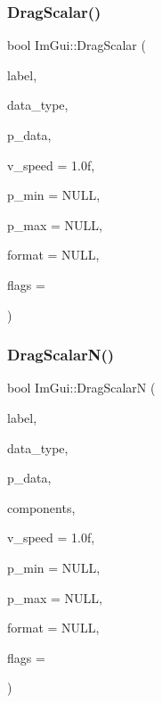 \subsubsection{\texorpdfstring{Drag\+Scalar()}{DragScalar()}}
{\footnotesize\ttfamily bool Im\+Gui\+::\+Drag\+Scalar (\begin{DoxyParamCaption}\item[{const char $\ast$}]{label,  }\item[{Im\+Gui\+Data\+Type}]{data\+\_\+type,  }\item[{\hyperlink{imgui__impl__opengl3__loader_8h_ac668e7cffd9e2e9cfee428b9b2f34fa7}{void} $\ast$}]{p\+\_\+data,  }\item[{float}]{v\+\_\+speed = {\ttfamily 1.0f},  }\item[{const \hyperlink{imgui__impl__opengl3__loader_8h_ac668e7cffd9e2e9cfee428b9b2f34fa7}{void} $\ast$}]{p\+\_\+min = {\ttfamily NULL},  }\item[{const \hyperlink{imgui__impl__opengl3__loader_8h_ac668e7cffd9e2e9cfee428b9b2f34fa7}{void} $\ast$}]{p\+\_\+max = {\ttfamily NULL},  }\item[{const char $\ast$}]{format = {\ttfamily NULL},  }\item[{Im\+Gui\+Slider\+Flags}]{flags = {} }\end{DoxyParamCaption})}

\mbox{\label{namespaceImGui_a1265d2b30ced1fca909e26c8f718fcbd}} 
\subsubsection{\texorpdfstring{Drag\+Scalar\+N()}{DragScalarN()}}
{\footnotesize\ttfamily bool Im\+Gui\+::\+Drag\+ScalarN (\begin{DoxyParamCaption}\item[{const char $\ast$}]{label,  }\item[{Im\+Gui\+Data\+Type}]{data\+\_\+type,  }\item[{\hyperlink{imgui__impl__opengl3__loader_8h_ac668e7cffd9e2e9cfee428b9b2f34fa7}{void} $\ast$}]{p\+\_\+data,  }\item[{int}]{components,  }\item[{float}]{v\+\_\+speed = {\ttfamily 1.0f},  }\item[{const \hyperlink{imgui__impl__opengl3__loader_8h_ac668e7cffd9e2e9cfee428b9b2f34fa7}{void} $\ast$}]{p\+\_\+min = {\ttfamily NULL},  }\item[{const \hyperlink{imgui__impl__opengl3__loader_8h_ac668e7cffd9e2e9cfee428b9b2f34fa7}{void} $\ast$}]{p\+\_\+max = {\ttfamily NULL},  }\item[{const char $\ast$}]{format = {\ttfamily NULL},  }\item[{Im\+Gui\+Slider\+Flags}]{flags = {} }\end{DoxyParamCaption})}


